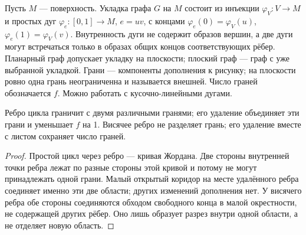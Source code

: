 \begingroup
\setlength{\parskip}{2pt}
\begin{definition}
Пусть \(M\) — поверхность. Укладка графа \(G\) на \(M\) состоит
из инъекции \(\varphi_V:V\to M\) и простых дуг
\(\varphi_e:[0,1]\to M\), \(e=uv\), с концами
\(\varphi_e(0)=\varphi_V(u)\), \(\varphi_e(1)=\varphi_V(v)\).
Внутренность дуги не содержит образов вершин, а две дуги могут встречаться
только в образах общих концов соответствующих рёбер.
Планарный граф допускает укладку на плоскости; плоский граф — граф
с уже выбранной укладкой. Грани — компоненты дополнения к рисунку;
на плоскости ровно одна грань неограниченна и называется внешней.
Число граней обозначается \(f\). Можно работать с кусочно-линейными дугами.
\end{definition}
\begin{lemma}
Ребро цикла граничит с двумя различными гранями; его удаление объединяет
эти грани и уменьшает \(f\) на 1. Висячее ребро не разделяет грань;
его удаление вместе с листом сохраняет число граней.
\end{lemma}
\begin{proof}
Простой цикл через ребро — кривая Жордана. Две стороны внутренней
точки ребра лежат по разные стороны этой кривой и потому не могут
принадлежать одной грани. Малый открытый коридор на месте удалённого
ребра соединяет именно эти две области; других изменений дополнения нет.
У висячего ребра обе стороны соединяются обходом свободного конца
в малой окрестности, не содержащей других рёбер. Оно лишь образует
разрез внутри одной области, а не отделяет новую область.
\end{proof}


